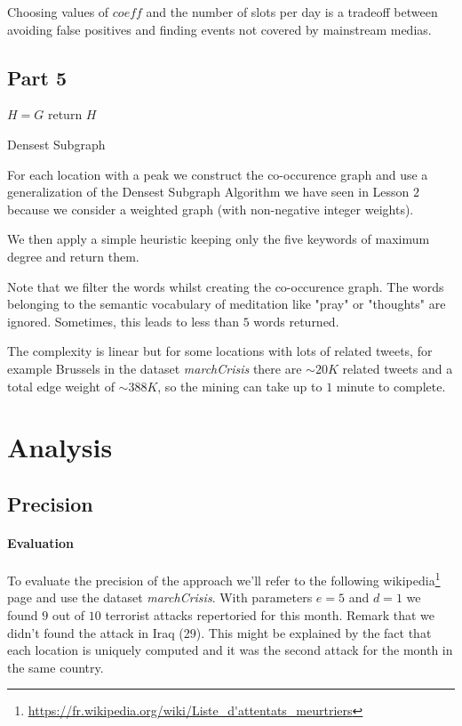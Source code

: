 \documentclass[a4paper]{article}
\begin{document}
 Choosing values of $coeff$ and the number of slots per day is a tradeoff between avoiding false positives and finding events not covered by mainstream medias.
 
\subsection{Part 5}

\begin{algorithm}
	$H = G$\;
  return $H$\;
 \caption{Densest Subgraph}
\end{algorithm}

For each location with a peak we construct the co-occurence graph and use a generalization of the Densest Subgraph Algorithm we have seen in Lesson $2$ because we consider a weighted graph (with non-negative integer weights).

We then apply a simple heuristic keeping only the five keywords of maximum degree and return them.

Note that we filter the words whilst creating the co-occurence graph. The words belonging to the semantic vocabulary of meditation like "pray" or "thoughts" are ignored. Sometimes, this leads to less than $5$ words returned.

The complexity is linear but for some locations with lots of related tweets, for example Brussels in the dataset \textit{marchCrisis} there are $\sim 20K$ related tweets and a total edge weight of $\sim 388K$, so the mining can take up to $1$ minute to complete.

\section{Analysis}
\subsection{Precision}
\paragraph{Evaluation}
To evaluate the precision of the approach we'll refer to the following wikipedia\footnote{\url{https://fr.wikipedia.org/wiki/Liste_d'attentats_meurtriers}} page and use the dataset \textit{marchCrisis}. 
With parameters $e=5$ and $d=1$ we found $9$ out of $10$ terrorist attacks repertoried for this month. Remark that we didn't found the attack in Iraq (29). This might be explained by the fact that each location is uniquely computed and it was the second attack for the month in the same country.
\end{document}
